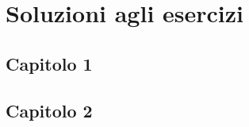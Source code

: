 
\chapter{Soluzioni agli esercizi}
\section*{Capitolo 1}
\def\thesection{1.1}
\begin{esercizi}
	\item
	\item
	\item
	\item
	\item
\end{esercizi}
\section*{Capitolo 2}
\def\thesection{2.1}
\begin{esercizi}
	\item
	\item
	\item
	\item
	\item
\end{esercizi}
\def\thesection{2.2}
\begin{esercizi}
	\item
	\item
	\item
	\item
	\item
\end{esercizi}
\def\thesection{2.3}
\begin{esercizi}
	\item
	\item
	\item
	\item
	\item
\end{esercizi}
\def\thesection{2.4}
\begin{esercizi}
	\item
	\item
	\item
	\item
	\item
\end{esercizi}
\def\thesection{2.5}
\begin{esercizi}
	\item
	\item
	\item
	\item
	\item
\end{esercizi}
